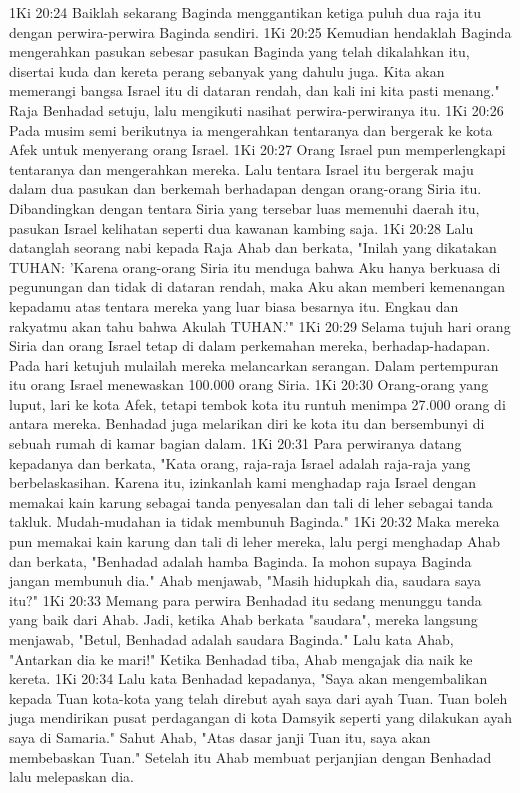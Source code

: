 1Ki 20:24  Baiklah sekarang Baginda menggantikan ketiga puluh dua raja itu dengan perwira-perwira Baginda sendiri.
1Ki 20:25  Kemudian hendaklah Baginda mengerahkan pasukan sebesar pasukan Baginda yang telah dikalahkan itu, disertai kuda dan kereta perang sebanyak yang dahulu juga. Kita akan memerangi bangsa Israel itu di dataran rendah, dan kali ini kita pasti menang." Raja Benhadad setuju, lalu mengikuti nasihat perwira-perwiranya itu.
1Ki 20:26  Pada musim semi berikutnya ia mengerahkan tentaranya dan bergerak ke kota Afek untuk menyerang orang Israel.
1Ki 20:27  Orang Israel pun memperlengkapi tentaranya dan mengerahkan mereka. Lalu tentara Israel itu bergerak maju dalam dua pasukan dan berkemah berhadapan dengan orang-orang Siria itu. Dibandingkan dengan tentara Siria yang tersebar luas memenuhi daerah itu, pasukan Israel kelihatan seperti dua kawanan kambing saja.
1Ki 20:28  Lalu datanglah seorang nabi kepada Raja Ahab dan berkata, "Inilah yang dikatakan TUHAN: 'Karena orang-orang Siria itu menduga bahwa Aku hanya berkuasa di pegunungan dan tidak di dataran rendah, maka Aku akan memberi kemenangan kepadamu atas tentara mereka yang luar biasa besarnya itu. Engkau dan rakyatmu akan tahu bahwa Akulah TUHAN.'"
1Ki 20:29  Selama tujuh hari orang Siria dan orang Israel tetap di dalam perkemahan mereka, berhadap-hadapan. Pada hari ketujuh mulailah mereka melancarkan serangan. Dalam pertempuran itu orang Israel menewaskan 100.000 orang Siria.
1Ki 20:30  Orang-orang yang luput, lari ke kota Afek, tetapi tembok kota itu runtuh menimpa 27.000 orang di antara mereka. Benhadad juga melarikan diri ke kota itu dan bersembunyi di sebuah rumah di kamar bagian dalam.
1Ki 20:31  Para perwiranya datang kepadanya dan berkata, "Kata orang, raja-raja Israel adalah raja-raja yang berbelaskasihan. Karena itu, izinkanlah kami menghadap raja Israel dengan memakai kain karung sebagai tanda penyesalan dan tali di leher sebagai tanda takluk. Mudah-mudahan ia tidak membunuh Baginda."
1Ki 20:32  Maka mereka pun memakai kain karung dan tali di leher mereka, lalu pergi menghadap Ahab dan berkata, "Benhadad adalah hamba Baginda. Ia mohon supaya Baginda jangan membunuh dia." Ahab menjawab, "Masih hidupkah dia, saudara saya itu?"
1Ki 20:33  Memang para perwira Benhadad itu sedang menunggu tanda yang baik dari Ahab. Jadi, ketika Ahab berkata "saudara", mereka langsung menjawab, "Betul, Benhadad adalah saudara Baginda." Lalu kata Ahab, "Antarkan dia ke mari!" Ketika Benhadad tiba, Ahab mengajak dia naik ke kereta.
1Ki 20:34  Lalu kata Benhadad kepadanya, "Saya akan mengembalikan kepada Tuan kota-kota yang telah direbut ayah saya dari ayah Tuan. Tuan boleh juga mendirikan pusat perdagangan di kota Damsyik seperti yang dilakukan ayah saya di Samaria." Sahut Ahab, "Atas dasar janji Tuan itu, saya akan membebaskan Tuan." Setelah itu Ahab membuat perjanjian dengan Benhadad lalu melepaskan dia.
